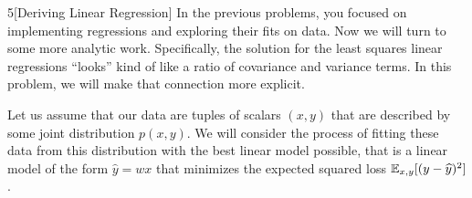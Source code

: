 \documentclass[expanded]{lkx_pset}
\begin{document}
\begin{problem}{5}[Deriving Linear Regression]
  In the previous problems, you focused on implementing regressions
  and exploring their fits on data. Now we will turn to some more
  analytic work.  Specifically, the solution for the least squares
  linear regressions ``looks'' kind of like a ratio of covariance and
  variance terms.  In this problem, we will make that connection more
  explicit.

  \medskip
  Let us assume that our data are tuples of scalars $(x,y)$ that are
  described by some joint distribution $p(x,y)$. We will consider the process of fitting these data from this distribution with the best linear model
  possible, that is a linear model of the form $\hat{y} = wx$ that
  minimizes the expected squared loss $\mathbb{E}_{x,y}[ ( y - \widehat{y} )^2
  ]$.
\end{problem}
  
\end{document}
